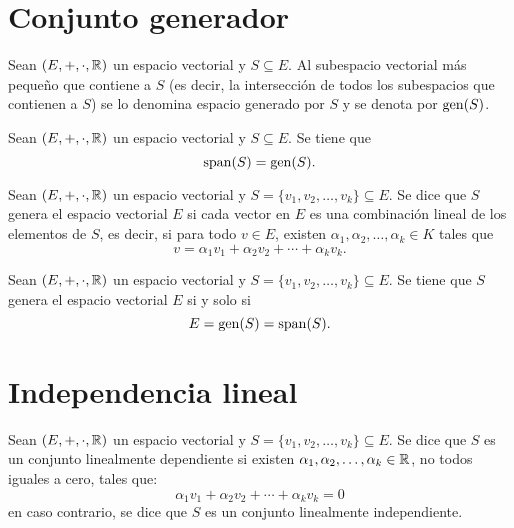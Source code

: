 \documentclass[a4,11pt]{aleph-notas}
\begin{document}
\encabezado

\section{Conjunto generador}

\begin{defi}
    Sean $(E,+,\cdot,\mathbb{R})$ un espacio vectorial y $S\subseteq E$. Al subespacio vectorial más pequeño que contiene a $S$ (es decir, la intersección de todos los subespacios que contienen a $S$) se lo denomina espacio generado por $S$ y se denota por $\operatorname{gen}(S)$.
\end{defi}

\begin{teo}
    Sean $(E,+,\cdot,\mathbb{R})$ un espacio vectorial y $S\subseteq E$. Se tiene que
    \[
        \operatorname{span}(S)=\operatorname{gen}(S).
    \]
\end{teo}


\begin{defi}
    Sean $(E,+,\cdot,\mathbb{R})$ un espacio vectorial y $S=\{v_1,v_2,\ldots,v_k\}\subseteq E$. Se dice que $S$ genera el espacio vectorial $E$ si cada vector en $E$ es una combinación lineal de los elementos de $S$, es decir, si para todo $v\in E$, existen $\alpha_1, \alpha_2, \ldots, \alpha_k\in K$ tales que
    \[
        v = \alpha_1v_1+ \alpha_2v_2+ \cdots+ \alpha_k v_k.
    \]
\end{defi}


\begin{teo}
    Sean $(E,+,\cdot,\mathbb{R})$ un espacio vectorial y $S=\{v_1,v_2,\ldots,v_k\}\subseteq E$. Se tiene que $S$ genera el espacio vectorial $E$ si y solo si
    \[
        E = \operatorname{gen}(S) = \operatorname{span}(S).
    \]
\end{teo}

\section{Independencia lineal}

\begin{defi}
    Sean $(E,+,\cdot,\mathbb{R})$ un espacio vectorial y $S=\{v_1,v_2,\ldots,v_k\}\subseteq E$. Se dice que $S$ es un conjunto linealmente dependiente si existen $\alpha_1, \alpha_2, \ldots, \alpha_k \in \mathbb{R}$, no todos iguales a cero, tales que:
    \[
        \alpha_1 v_1 + \alpha_2 v_2 + \cdots + \alpha_k v_k = 0
    \]
    en caso contrario, se dice que $S$ es un conjunto linealmente independiente. 
\end{defi}
\end{document}
